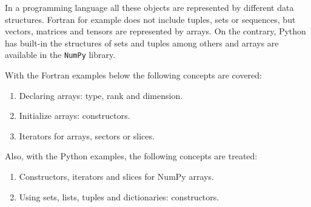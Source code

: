 In a programming language all these objects are represented by different data structures.
Fortran for example does not include tuples, sets or sequences, but vectors, matrices and tensors are represented by arrays. 
On the contrary, Python has built-in the structures of sets and tuples among others and arrays are available in the \texttt{NumPy} library.  

With the Fortran examples below the following concepts are covered:
\begin{enumerate}[noitemsep]
    \item Declaring arrays: type, rank and dimension.
    \item Initialize arrays: constructors. 
    \item Iterators for arrays, sectors or slices. 
\end{enumerate}

Also, with the Python examples, the following concepts are treated:
\begin{enumerate}[noitemsep]
    \item Constructors, iterators and slices for NumPy arrays.
    \item Using sets, lists, tuples and dictionaries: constructors.
\end{enumerate}





        \newpage

